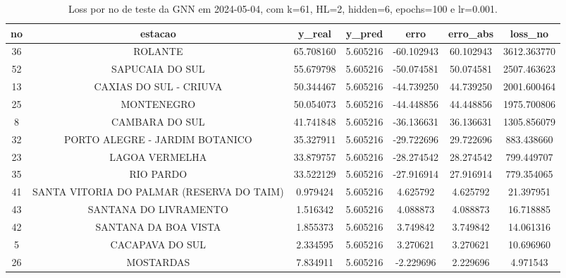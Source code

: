 \begin{table}[h]
\centering
\caption{Loss por no de teste da GNN em 2024-05-04, com k=61, HL=2, hidden=6, epochs=100 e lr=0.001.}
\label{tab:gnn_loss_k61_hl2_h6_e100_d20240504}
\begin{tabular}{ccccccc}
\toprule
no & estacao & y\_real & y\_pred & erro & erro\_abs & loss\_no \\
\midrule
36 & ROLANTE & 65.708160 & 5.605216 & -60.102943 & 60.102943 & 3612.363770 \\
52 & SAPUCAIA DO SUL & 55.679798 & 5.605216 & -50.074581 & 50.074581 & 2507.463623 \\
13 & CAXIAS DO SUL - CRIUVA & 50.344467 & 5.605216 & -44.739250 & 44.739250 & 2001.600464 \\
25 & MONTENEGRO & 50.054073 & 5.605216 & -44.448856 & 44.448856 & 1975.700806 \\
8 & CAMBARA DO SUL & 41.741848 & 5.605216 & -36.136631 & 36.136631 & 1305.856079 \\
32 & PORTO ALEGRE - JARDIM BOTANICO & 35.327911 & 5.605216 & -29.722696 & 29.722696 & 883.438660 \\
23 & LAGOA VERMELHA & 33.879757 & 5.605216 & -28.274542 & 28.274542 & 799.449707 \\
35 & RIO PARDO & 33.522129 & 5.605216 & -27.916914 & 27.916914 & 779.354065 \\
41 & SANTA VITORIA DO PALMAR (RESERVA DO TAIM) & 0.979424 & 5.605216 & 4.625792 & 4.625792 & 21.397951 \\
43 & SANTANA DO LIVRAMENTO & 1.516342 & 5.605216 & 4.088873 & 4.088873 & 16.718885 \\
42 & SANTANA DA BOA VISTA & 1.855373 & 5.605216 & 3.749842 & 3.749842 & 14.061316 \\
5 & CACAPAVA DO SUL & 2.334595 & 5.605216 & 3.270621 & 3.270621 & 10.696960 \\
26 & MOSTARDAS & 7.834911 & 5.605216 & -2.229696 & 2.229696 & 4.971543 \\
\bottomrule
\end{tabular}
\end{table}
